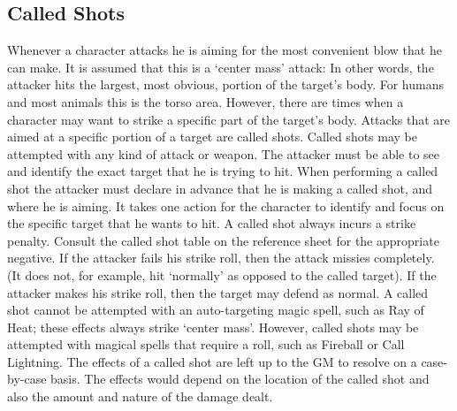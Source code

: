 \documentclass[twoside]{book}
\begin{document}
\subsection{Called Shots}
      Whenever a character attacks he is aiming for the
               most convenient blow that he can make. It is assumed that
               this is a `center mass' attack: In other
               words, the attacker hits the largest, most obvious,
               portion of the target's body. For humans and most
               animals this is the torso area.   However, there are times when a character may want
               to strike a specific part of the target's body.
               Attacks that are aimed at a specific portion of a target
               are called shots. Called shots may be attempted with any
               kind of attack or weapon. The attacker must be able to see
               and identify the exact target that he is trying to hit.
                 When performing a called shot the attacker must
               declare in advance that he is making a called shot, and
               where he is aiming. It takes one action for the character
               to identify and focus on the specific target that he wants
               to hit. A called shot always incurs a strike penalty.
               Consult the called shot table on the reference sheet for
               the appropriate negative. If the attacker fails his strike
               roll, then the attack missies completely. (It does not,
               for example, hit `normally' as opposed to the
               called target). If the attacker makes his strike roll,
               then the target may defend as normal.   A called shot cannot be attempted with an
               auto-targeting magic spell, such as Ray of Heat; these
               effects always strike `center mass'. However,
               called shots may be attempted with magical spells that
               require a roll, such as Fireball or Call Lightning.
                 The effects of a called shot are left up to the GM
               to resolve on a case-by-case basis. The effects would
               depend on the location of the called shot and also the
               amount and nature of the damage dealt. 
  
\end{document}
